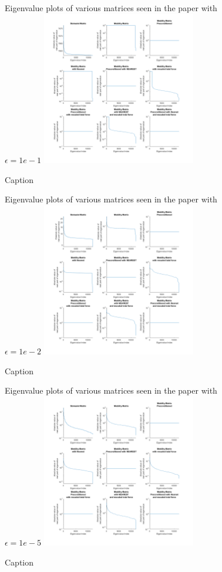  \begin{figure}
     \centering
     Eigenvalue plots of various matrices seen in the paper with $\epsilon=1e-1$
     \includegraphics[width=0.6\textwidth]{Images/Eigenplots/EigenPlots-1.pdf}
     \caption{Caption}
     \label{fig:Eigen1}
 \end{figure}
 \begin{figure}
 \ContinuedFloat
     \centering
     Eigenvalue plots of various matrices seen in the paper with $\epsilon=1e-2$
     \includegraphics[width=0.6\textwidth]{Images/Eigenplots/EigenPlots-2.pdf}
     \caption{Caption}
     \label{fig:Eigen2}
\end{figure}
\begin{figure}
\ContinuedFloat
     \centering
     Eigenvalue plots of various matrices seen in the paper with $\epsilon=1e-5$
     \includegraphics[width=0.6\textwidth]{Images/Eigenplots/EigenPlots-5.pdf}
     \caption{Caption}
     \label{fig:Eigen5}
\end{figure}

